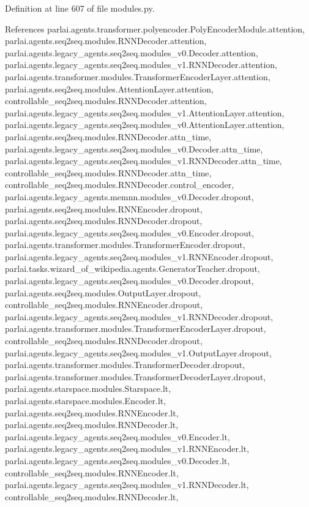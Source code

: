 Definition at line 607 of file modules.\+py.



References parlai.\+agents.\+transformer.\+polyencoder.\+Poly\+Encoder\+Module.\+attention, parlai.\+agents.\+seq2seq.\+modules.\+R\+N\+N\+Decoder.\+attention, parlai.\+agents.\+legacy\+\_\+agents.\+seq2seq.\+modules\+\_\+v0.\+Decoder.\+attention, parlai.\+agents.\+legacy\+\_\+agents.\+seq2seq.\+modules\+\_\+v1.\+R\+N\+N\+Decoder.\+attention, parlai.\+agents.\+transformer.\+modules.\+Transformer\+Encoder\+Layer.\+attention, parlai.\+agents.\+seq2seq.\+modules.\+Attention\+Layer.\+attention, controllable\+\_\+seq2seq.\+modules.\+R\+N\+N\+Decoder.\+attention, parlai.\+agents.\+legacy\+\_\+agents.\+seq2seq.\+modules\+\_\+v1.\+Attention\+Layer.\+attention, parlai.\+agents.\+legacy\+\_\+agents.\+seq2seq.\+modules\+\_\+v0.\+Attention\+Layer.\+attention, parlai.\+agents.\+seq2seq.\+modules.\+R\+N\+N\+Decoder.\+attn\+\_\+time, parlai.\+agents.\+legacy\+\_\+agents.\+seq2seq.\+modules\+\_\+v0.\+Decoder.\+attn\+\_\+time, parlai.\+agents.\+legacy\+\_\+agents.\+seq2seq.\+modules\+\_\+v1.\+R\+N\+N\+Decoder.\+attn\+\_\+time, controllable\+\_\+seq2seq.\+modules.\+R\+N\+N\+Decoder.\+attn\+\_\+time, controllable\+\_\+seq2seq.\+modules.\+R\+N\+N\+Decoder.\+control\+\_\+encoder, parlai.\+agents.\+legacy\+\_\+agents.\+memnn.\+modules\+\_\+v0.\+Decoder.\+dropout, parlai.\+agents.\+seq2seq.\+modules.\+R\+N\+N\+Encoder.\+dropout, parlai.\+agents.\+seq2seq.\+modules.\+R\+N\+N\+Decoder.\+dropout, parlai.\+agents.\+legacy\+\_\+agents.\+seq2seq.\+modules\+\_\+v0.\+Encoder.\+dropout, parlai.\+agents.\+transformer.\+modules.\+Transformer\+Encoder.\+dropout, parlai.\+agents.\+legacy\+\_\+agents.\+seq2seq.\+modules\+\_\+v1.\+R\+N\+N\+Encoder.\+dropout, parlai.\+tasks.\+wizard\+\_\+of\+\_\+wikipedia.\+agents.\+Generator\+Teacher.\+dropout, parlai.\+agents.\+legacy\+\_\+agents.\+seq2seq.\+modules\+\_\+v0.\+Decoder.\+dropout, parlai.\+agents.\+seq2seq.\+modules.\+Output\+Layer.\+dropout, controllable\+\_\+seq2seq.\+modules.\+R\+N\+N\+Encoder.\+dropout, parlai.\+agents.\+legacy\+\_\+agents.\+seq2seq.\+modules\+\_\+v1.\+R\+N\+N\+Decoder.\+dropout, parlai.\+agents.\+transformer.\+modules.\+Transformer\+Encoder\+Layer.\+dropout, controllable\+\_\+seq2seq.\+modules.\+R\+N\+N\+Decoder.\+dropout, parlai.\+agents.\+legacy\+\_\+agents.\+seq2seq.\+modules\+\_\+v1.\+Output\+Layer.\+dropout, parlai.\+agents.\+transformer.\+modules.\+Transformer\+Decoder.\+dropout, parlai.\+agents.\+transformer.\+modules.\+Transformer\+Decoder\+Layer.\+dropout, parlai.\+agents.\+starspace.\+modules.\+Starspace.\+lt, parlai.\+agents.\+starspace.\+modules.\+Encoder.\+lt, parlai.\+agents.\+seq2seq.\+modules.\+R\+N\+N\+Encoder.\+lt, parlai.\+agents.\+seq2seq.\+modules.\+R\+N\+N\+Decoder.\+lt, parlai.\+agents.\+legacy\+\_\+agents.\+seq2seq.\+modules\+\_\+v0.\+Encoder.\+lt, parlai.\+agents.\+legacy\+\_\+agents.\+seq2seq.\+modules\+\_\+v1.\+R\+N\+N\+Encoder.\+lt, parlai.\+agents.\+legacy\+\_\+agents.\+seq2seq.\+modules\+\_\+v0.\+Decoder.\+lt, controllable\+\_\+seq2seq.\+modules.\+R\+N\+N\+Encoder.\+lt, parlai.\+agents.\+legacy\+\_\+agents.\+seq2seq.\+modules\+\_\+v1.\+R\+N\+N\+Decoder.\+lt, controllable\+\_\+seq2seq.\+modules.\+R\+N\+N\+Decoder.\+lt, 